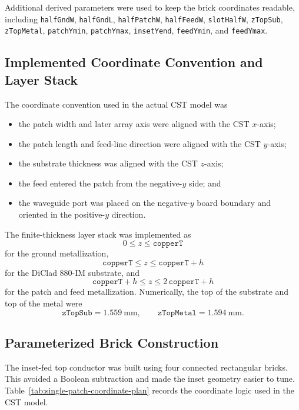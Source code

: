 Additional derived parameters were used to keep the brick coordinates readable, including
\texttt{halfGndW}, \texttt{halfGndL}, \texttt{halfPatchW}, \texttt{halfFeedW},
\texttt{slotHalfW}, \texttt{zTopSub}, \texttt{zTopMetal}, \texttt{patchYmin},
\texttt{patchYmax}, \texttt{insetYend}, \texttt{feedYmin}, and \texttt{feedYmax}.

\subsection{Implemented Coordinate Convention and Layer Stack}
\label{subsec:cst-single-patch-geometry-logic}

The coordinate convention used in the actual CST model was
\begin{itemize}
    \item the patch width and later array axis were aligned with the CST $x$-axis;
    \item the patch length and feed-line direction were aligned with the CST $y$-axis;
    \item the substrate thickness was aligned with the CST $z$-axis;
    \item the feed entered the patch from the negative-$y$ side; and
    \item the waveguide port was placed on the negative-$y$ board boundary and oriented in the positive-$y$ direction.
\end{itemize}

The finite-thickness layer stack was implemented as
\[
0\le z\le \texttt{copperT}
\]
for the ground metallization,
\[
\texttt{copperT}\le z\le \texttt{copperT}+h
\]
for the DiClad 880-IM substrate, and
\[
\texttt{copperT}+h\le z\le 2\,\texttt{copperT}+h
\]
for the patch and feed metallization. Numerically, the top of the substrate and top of the metal were
\[
\texttt{zTopSub}=1.559~\mathrm{mm},
\qquad
\texttt{zTopMetal}=1.594~\mathrm{mm}.
\]

\subsection{Parameterized Brick Construction}
\label{subsec:single-patch-coordinate-plan}

The inset-fed top conductor was built using four connected rectangular bricks. This avoided a Boolean
subtraction and made the inset geometry easier to tune. Table~\ref{tab:single-patch-coordinate-plan}
records the coordinate logic used in the CST model.

